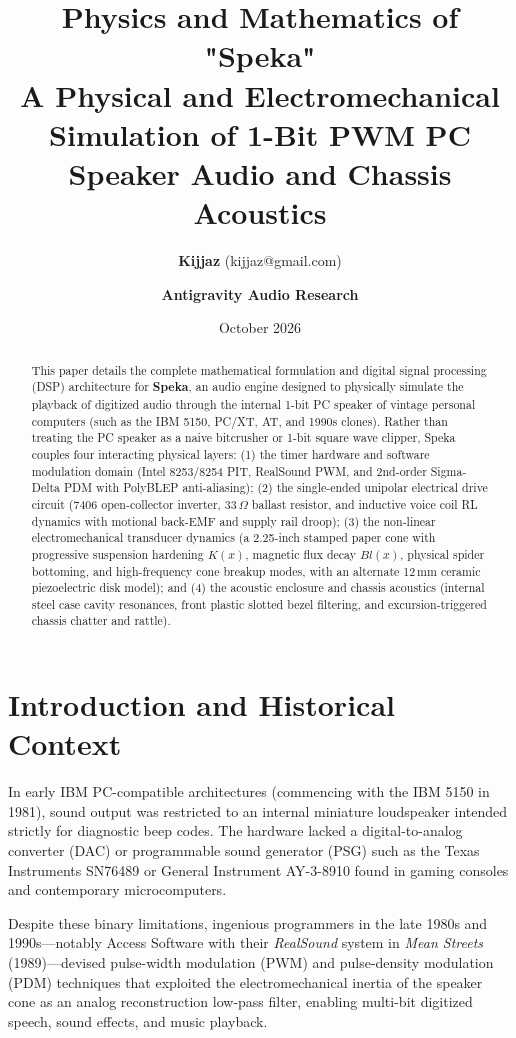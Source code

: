 \documentclass[11pt,a4paper]{article}
\title{\textbf{Physics and Mathematics of "Speka"}\\
\large A Physical and Electromechanical Simulation of 1-Bit PWM PC Speaker Audio and Chassis Acoustics}
\author{\textbf{Kijjaz} (kijjaz@gmail.com) \and \textbf{Antigravity Audio Research}}
\date{October 2026}
\begin{document}
\maketitle

\begin{abstract}
This paper details the complete mathematical formulation and digital signal processing (DSP) architecture for \textbf{Speka}, an audio engine designed to physically simulate the playback of digitized audio through the internal 1-bit PC speaker of vintage personal computers (such as the IBM 5150, PC/XT, AT, and 1990s clones). Rather than treating the PC speaker as a naive bitcrusher or 1-bit square wave clipper, Speka couples four interacting physical layers: (1) the timer hardware and software modulation domain (Intel 8253/8254 PIT, RealSound PWM, and 2nd-order Sigma-Delta PDM with PolyBLEP anti-aliasing); (2) the single-ended unipolar electrical drive circuit (7406 open-collector inverter, $33\,\Omega$ ballast resistor, and inductive voice coil RL dynamics with motional back-EMF and supply rail droop); (3) the non-linear electromechanical transducer dynamics (a 2.25-inch stamped paper cone with progressive suspension hardening $K(x)$, magnetic flux decay $Bl(x)$, physical spider bottoming, and high-frequency cone breakup modes, with an alternate 12\,mm ceramic piezoelectric disk model); and (4) the acoustic enclosure and chassis acoustics (internal steel case cavity resonances, front plastic slotted bezel filtering, and excursion-triggered chassis chatter and rattle).
\end{abstract}

\section{Introduction and Historical Context}
In early IBM PC-compatible architectures (commencing with the IBM 5150 in 1981), sound output was restricted to an internal miniature loudspeaker intended strictly for diagnostic beep codes. The hardware lacked a digital-to-analog converter (DAC) or programmable sound generator (PSG) such as the Texas Instruments SN76489 or General Instrument AY-3-8910 found in gaming consoles and contemporary microcomputers.

Despite these binary limitations, ingenious programmers in the late 1980s and 1990s—notably Access Software with their \textit{RealSound} system in \textit{Mean Streets} (1989)—devised pulse-width modulation (PWM) and pulse-density modulation (PDM) techniques that exploited the electromechanical inertia of the speaker cone as an analog reconstruction low-pass filter, enabling multi-bit digitized speech, sound effects, and music playback.
\end{document}
